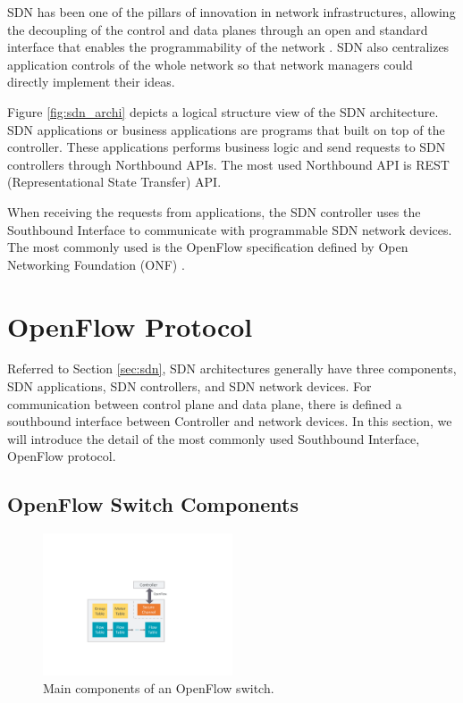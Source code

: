 SDN has been one of the pillars of innovation in network infrastructures, allowing the decoupling of the control and data planes through an open and standard interface that enables the programmability of the network \cite{sdn-define}.
SDN also centralizes application controls of the whole network so that network managers could directly implement their
ideas.

Figure \ref{fig:sdn_archi} depicts a logical structure view of the SDN architecture.
SDN applications or business applications are programs that built on top of the controller.
These applications performs business logic and send requests to SDN controllers through Northbound APIs.
The most used Northbound API is REST (Representational State Transfer) API.

When receiving the requests from applications, the SDN controller uses the Southbound Interface to communicate with programmable SDN network devices.
The most commonly used is the OpenFlow specification \cite{openflow-spec} defined by Open Networking Foundation (ONF) \cite{onf}.





\section{OpenFlow Protocol} \label{sec:openflow}

Referred to Section \ref{sec:sdn}, SDN architectures generally have three components, SDN applications, SDN controllers, and SDN network devices.
For communication between control plane and data plane, there is defined a southbound interface between Controller and network devices.
In this section, we will introduce the detail of the most commonly used Southbound Interface, OpenFlow protocol.



\subsection{OpenFlow Switch Components}

\begin{figure}[!ht]
\centering
\includegraphics[width=0.5\textwidth]{./fig/openflow_switch_component}
\caption{Main components of an OpenFlow switch. \cite{openflow-spec}}
\label{fig:openflow_switch_component}
\end{figure}

